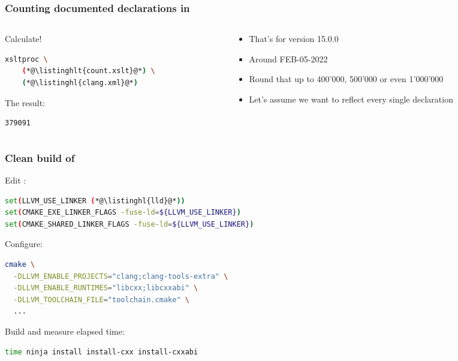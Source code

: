 \documentclass[compress,table,xcolor=table]{beamer}
\begin{document}
\begin{frame}[fragile]
  \frametitle{Counting documented declarations in }
  \begin{columns}
    \begin{column}{.35\textwidth}
      \Large
      Calculate!
      \begin{lstlisting}[language=bash,basicstyle=\small\ttfamily]
xsltproc \
    (*@\listinghlt{count.xslt}@*) \
    (*@\listinghl{clang.xml}@*)
      \end{lstlisting}
      The result:
      \begin{verbatim}
379091
      \end{verbatim}
    \end{column}
    \begin{column}{.55\textwidth}
      \large
      \begin{itemize}
        \item That's for version 15.0.0
        \item Around FEB-05-2022
        \item Round that up to 400'000, 500'000 or even 1'000'000
        \item Let's assume we want to reflect every single declaration
      \end{itemize}
    \end{column}
  \end{columns}
\end{frame}
\begin{frame}[fragile]
  \frametitle{Clean build of \inlinecode{clang}}
  Edit :
  \begin{lstlisting}[language=bash,basicstyle=\scriptsize\ttfamily]
set(LLVM_USE_LINKER (*@\listinghl{lld}@*))
set(CMAKE_EXE_LINKER_FLAGS -fuse-ld=${LLVM_USE_LINKER})
set(CMAKE_SHARED_LINKER_FLAGS -fuse-ld=${LLVM_USE_LINKER})
  \end{lstlisting}
  Configure:
  \begin{lstlisting}[language=bash,basicstyle=\footnotesize\ttfamily]
cmake \
  -DLLVM_ENABLE_PROJECTS="clang;clang-tools-extra" \
  -DLLVM_ENABLE_RUNTIMES="libcxx;libcxxabi" \
  -DLLVM_TOOLCHAIN_FILE="toolchain.cmake" \
  ...
  \end{lstlisting}
  Build and measure elapsed time:
  \begin{lstlisting}[language=bash,basicstyle=\footnotesize\ttfamily]
time ninja install install-cxx install-cxxabi
  \end{lstlisting}
\end{frame}
\end{document}
